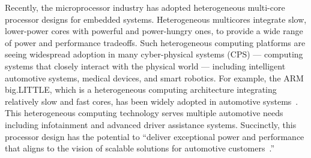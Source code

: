 
Recently, the microprocessor industry has adopted heterogeneous multi-core processor designs for embedded systems. Heterogeneous multicores integrate slow, lower-power cores with powerful and power-hungry ones, to provide a wide range of power and performance tradeoffs. %
  Such heterogeneous computing platforms are seeing widespread adoption in many cyber-physical systems (CPS) --- computing systems that closely interact with the physical world --- including intelligent automotive systems, medical devices, and smart robotics. %
 For example, the ARM big.LITTLE, which is a heterogeneous computing architecture integrating relatively slow and fast cores, has been widely adopted in automotive systems~\cite{armvehicle1, armvehicle2}. This heterogeneous computing technology serves multiple automotive needs including infotainment and advanced driver assistance systems. Succinctly, this processor design has the potential to  ``deliver exceptional power and performance that aligns to the vision of scalable solutions for automotive customers~\cite{armvehicle}.''
 
